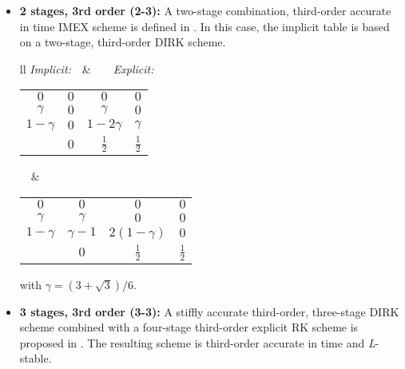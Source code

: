 \begin{itemize}
\begin{center}
\begin{tabular}{ll}
\textit{Implicit:}$\quad$&$\quad\quad$\textit{Explicit:}\\
\begin{tabular}{c|ccc}
$0$&$0$&$0$&$0$\\
$\gamma$&$0$&$\gamma$&$0$\\
$1$&$0$&$1-\gamma$&$\gamma$\\
\hline
&$0$&$1-\gamma$&$\gamma$
\end{tabular}$\quad$&
$\quad\quad$\begin{tabular}{c|ccc}
$0$&$0$&$0$&$0$\\
$\gamma$&$\gamma$&$0$&$0$\\
$1$&$\delta$&$1-\delta$&$0$\\
\hline
&$\delta$&$1-\delta$&$0$
\end{tabular}
\end{tabular}
\end{center}
with $\gamma=(2-\sqrt{2})/2$ and $\delta=1-1/(2\gamma)$.
\item \textbf{2 stages, 3rd order (2-3):}
A two-stage combination, third-order accurate in time IMEX scheme is defined in \cite{ascher_implicit-explicit_1997}. In this case, the implicit table is based on a two-stage, third-order DIRK scheme.
\begin{center}
\begin{tabular}{ll}
\textit{Implicit:}$\quad$&$\quad\quad$\textit{Explicit:}\\
\begin{tabular}{c|ccc}
$0$&$0$&$0$&$0$\\
$\gamma$&$0$&$\gamma$&$0$\\
$1-\gamma$&$0$&$1-2\gamma$&$\gamma$\\
\hline
&$0$&$\frac{1}{2}$&$\frac{1}{2}$
\end{tabular}$\quad$&
$\quad\quad$\begin{tabular}{c|ccc}
$0$&$0$&$0$&$0$\\
$\gamma$&$\gamma$&$0$&$0$\\
$1-\gamma$&$\gamma-1$&$2(1-\gamma)$&$0$\\
\hline
&$0$&$\frac{1}{2}$&$\frac{1}{2}$
\end{tabular}
\end{tabular}
\end{center}
with $\gamma=(3+\sqrt{3})/6$.
\item \textbf{3 stages, 3rd order (3-3):}
A stiffly accurate third-order, three-stage DIRK scheme combined with a four-stage third-order explicit RK scheme is proposed in \cite{ascher_implicit-explicit_1997}. The resulting scheme is third-order accurate in time and \textit{L}-stable.

\end{itemize}
